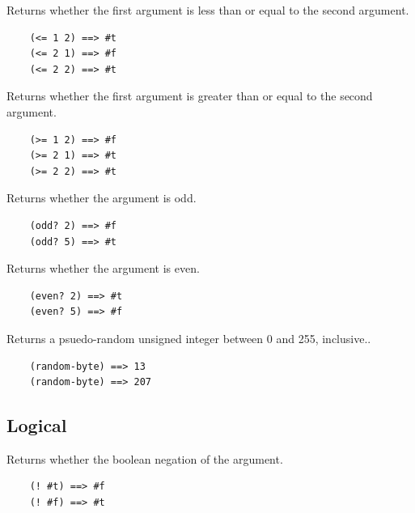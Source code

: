 \documentclass[12pt]{article}
\begin{document}

Returns whether the first argument is less than or equal to the second
argument.

\begin{verbatim}
    (<= 1 2) ==> #t
    (<= 2 1) ==> #f
    (<= 2 2) ==> #t
\end{verbatim}


Returns whether the first argument is greater than or equal to the
second argument.

\begin{verbatim}
    (>= 1 2) ==> #f
    (>= 2 1) ==> #t
    (>= 2 2) ==> #t
\end{verbatim}


Returns whether the argument is odd.

\begin{verbatim}
    (odd? 2) ==> #f
    (odd? 5) ==> #t
\end{verbatim}


Returns whether the argument is even.

\begin{verbatim}
    (even? 2) ==> #t
    (even? 5) ==> #f
\end{verbatim}


Returns a psuedo-random unsigned integer between 0 and 255, inclusive..

\begin{verbatim}
    (random-byte) ==> 13
    (random-byte) ==> 207
\end{verbatim}

\subsection{Logical}


Returns whether the boolean negation of the argument.

\begin{verbatim}
    (! #t) ==> #f
    (! #f) ==> #t
\end{verbatim}

\end{document}
